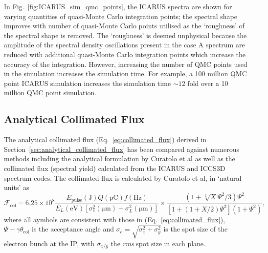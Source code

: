 \documentclass[../main.tex]{subfiles}
\begin{document}
In Fig.~\ref{fig:ICARUS_sim_qmc_points}, the \textsc{ICARUS} spectra are shown for varying quantities of quasi-Monte Carlo integration points; the spectral shape improves with number of quasi-Monte Carlo points utilised as the `roughness' of the spectral shape is removed. The `roughness' is deemed unphysical because the amplitude of the spectral density oscillations present in the case A spectrum are reduced with additional quasi-Monte Carlo integration points which increase the accuracy of the integration. However, increasing the number of QMC points used in the simulation increases the simulation time. For example, a 100 million QMC point \textsc{ICARUS} simulation increases the simulation time $\sim 12$ fold over a 10 million QMC point simulation.    

\subsection{Analytical Collimated Flux}
\label{sec:analytical_collimated_flux_benchmarking}

The analytical collimated flux (Eq.~\ref{eq:collimated_flux}) derived in Section~\ref{sec:analytical_collimated_flux} has been compared against numerous methods including the analytical formulation by Curatolo et al \cite{curatolo2017analytical} as well as the collimated flux (spectral yield) calculated from the \textsc{ICARUS} and \textsc{ICCS3D} \cite{krafft2016laser,ranjan2018simulation} spectrum codes. The collimated flux is calculated by Curatolo et al, in `natural units' as 
\begin{equation}
\mathcal{F}_{\mathrm{col}} = 6.25\times 10^{8}\frac{E_{\mathrm{pulse}}\left(\mathrm{\si{\joule}}\right)Q\left(\si{\pico\coulomb}\right)f\left(\si{\hertz}\right)}{E_{L}\left(\si{\electronvolt}\right)\left[\sigma_{e}^{2}\left(\si{\micro\meter}\right)+\sigma_{L}^{2}\left(\si{\micro\meter}\right)\right]}\times\frac{\left(1+\sqrt[3]{X}\Psi^{2}/3\right)\Psi^{2}}{\left[1+\left(1+X/2\right)\Psi^{2}\right]\left(1+\Psi^{2}\right)},
\label{eq:curatolo_collimated_flux}
\end{equation}
where all aymbols are consistent with those in (Eq.~\ref{eq:collimated_flux}), $\Psi-\gamma\theta_{\mathrm{col}}$ is the acceptance angle and $\sigma_{e} = \sqrt{\sigma_{x}^{2}+\sigma_{y}^{2}}$ is the  spot size of the electron bunch at the IP, with $\sigma_{x/y}$ the \textit{rms} spot size in each plane.
\end{document}
